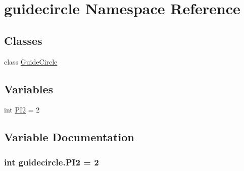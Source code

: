 \hypertarget{namespaceguidecircle}{}\section{guidecircle Namespace Reference}
\label{namespaceguidecircle}
\subsection*{Classes}
\begin{DoxyCompactItemize}
\item 
class \hyperlink{classguidecircle_1_1GuideCircle}{Guide\+Circle}
\end{DoxyCompactItemize}
\subsection*{Variables}
\begin{DoxyCompactItemize}
\item 
int \hyperlink{namespaceguidecircle_a0b64ae4b3cdf97307d53408b4371d3e1}{P\+I2} = 2
\end{DoxyCompactItemize}


\subsection{Variable Documentation}
\hypertarget{namespaceguidecircle_a0b64ae4b3cdf97307d53408b4371d3e1}{}
\subsubsection[{P\+I2}]{\setlength{\rightskip}{0pt plus 5cm}int guidecircle.\+P\+I2 = 2}\label{namespaceguidecircle_a0b64ae4b3cdf97307d53408b4371d3e1}
